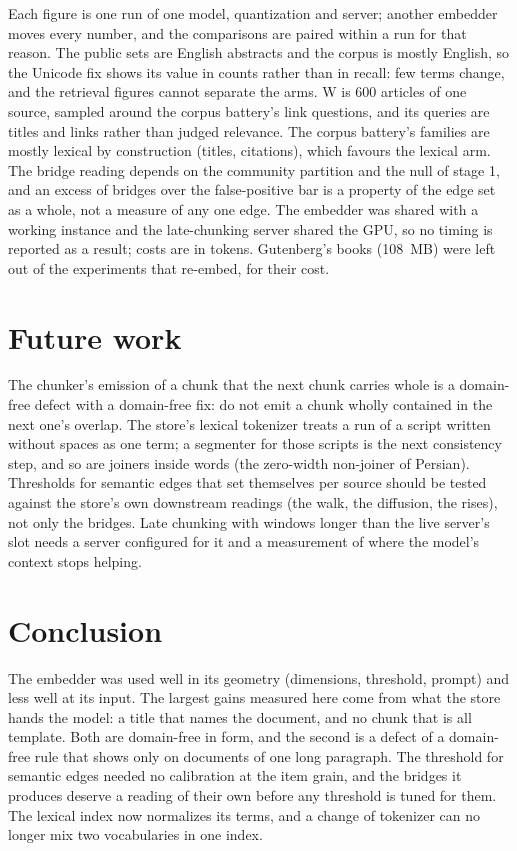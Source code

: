 \documentclass[11pt]{article}
\theoremstyle{plain}
\theoremstyle{definition}
\theoremstyle{remark}
\begin{document}
Each figure is one run of one model, quantization and server; another embedder moves every
number, and the comparisons are paired within a run for that reason. The public sets are English
abstracts and the corpus is mostly English, so the Unicode fix shows its value in counts rather
than in recall: few terms change, and the retrieval figures cannot separate the arms. W is 600
articles of one source, sampled around the corpus battery's link questions, and its queries are
titles and links rather than judged relevance. The corpus battery's families are mostly lexical
by construction (titles, citations), which favours the lexical arm. The bridge reading depends on
the community partition and the null of stage 1, and an excess of bridges over the false-positive
bar is a property of the edge set as a whole, not a measure of any one edge. The embedder was
shared with a working instance and the late-chunking server shared the GPU, so no timing is
reported as a result; costs are in tokens. Gutenberg's books (108~MB) were left out of the
experiments that re-embed, for their cost.

\section{Future work}

The chunker's emission of a chunk that the next chunk carries whole is a domain-free defect with
a domain-free fix: do not emit a chunk wholly contained in the next one's overlap. The store's
lexical tokenizer treats a run of a script written without spaces as one term; a segmenter for
those scripts is the next consistency step, and so are joiners inside words (the zero-width
non-joiner of Persian). Thresholds for semantic edges that set themselves per source should be
tested against the store's own downstream readings (the walk, the diffusion, the rises), not only
the bridges. Late chunking with windows longer than the live server's slot needs a server
configured for it and a measurement of where the model's context stops helping.

\section{Conclusion}

The embedder was used well in its geometry (dimensions, threshold, prompt) and less well at its
input. The largest gains measured here come from what the store hands the model: a title that
names the document, and no chunk that is all template. Both are domain-free in form, and the
second is a defect of a domain-free rule that shows only on documents of one long paragraph. The
threshold for semantic edges needed no calibration at the item grain, and the bridges it produces
deserve a reading of their own before any threshold is tuned for them. The lexical index now
normalizes its terms, and a change of tokenizer can no longer mix two vocabularies in one index.



\end{document}
